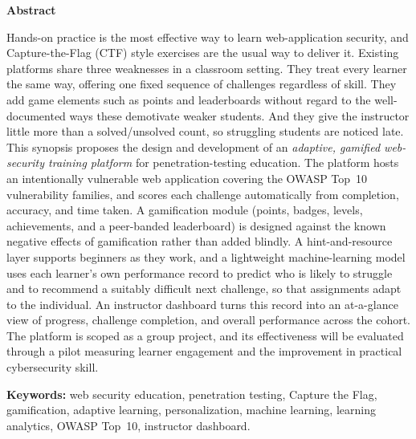 \begin{center}
{\large\bfseries Abstract}
\end{center}

\noindent
Hands-on practice is the most effective way to learn web-application security, and
Capture-the-Flag (CTF) style exercises are the usual way to deliver it. Existing
platforms share three weaknesses in a classroom setting. They treat
every learner the same way, offering one fixed sequence of challenges regardless of
skill. They add game elements such as points and leaderboards without regard to the
well-documented ways these demotivate weaker students. And they give the
instructor little more than a solved/unsolved count, so struggling students are
noticed late. This synopsis proposes the design and development of an
\emph{adaptive, gamified web-security training platform} for penetration-testing
education. The platform hosts an intentionally vulnerable web application covering
the OWASP Top~10 vulnerability families, and scores each challenge automatically
from completion, accuracy, and time taken. A gamification module (points, badges,
levels, achievements, and a peer-banded leaderboard) is designed against the known
negative effects of gamification rather than added blindly. A hint-and-resource
layer supports beginners as they work, and a lightweight machine-learning model
uses each learner's own performance record to predict who is likely to struggle and
to recommend a suitably difficult next challenge, so that assignments adapt to the
individual. An instructor dashboard turns this record into an at-a-glance view of
progress, challenge completion, and overall performance across the cohort. The
platform is scoped as a group project, and its effectiveness will be evaluated through a pilot measuring learner
engagement and the improvement in practical cybersecurity skill.

\vspace{0.8em}
\noindent\textbf{Keywords:} web security education, penetration testing,
Capture the Flag, gamification, adaptive learning, personalization, machine
learning, learning analytics, OWASP Top~10, instructor dashboard.
